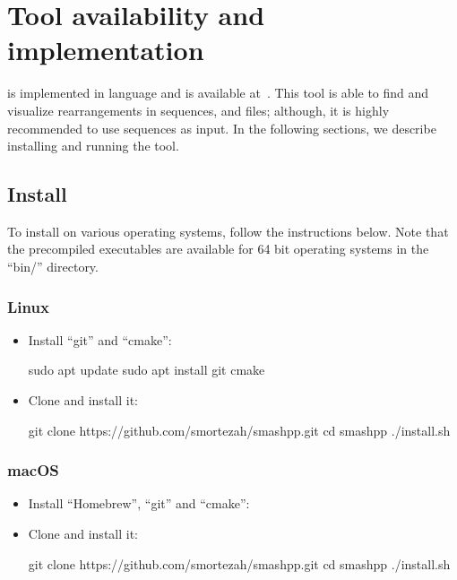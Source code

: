 \documentclass[a4paper,9pt]{extarticle}
\begin{document}
\clearpage
\section{Tool availability and implementation}
\label{sec.tool}
\smashpp is implemented in \cpp language and is available at~\cite{web-smashpp}. This tool is able to find and visualize rearrangements in sequences, \fasta and \fastq files; although, it is highly recommended to use sequences as input. In the following sections, we describe installing and running the \smashpp tool.

\subsection{Install}
To install \smashpp on various operating systems, follow the instructions below. Note that the precompiled executables are available for 64 bit operating systems in the ``bin/'' directory.


\subsubsection*{Linux}
\begin{itemize}
  \item Install ``git'' and ``cmake'':
\begin{code}[style=bash]
sudo apt update
sudo apt install git cmake
\end{code}
\item Clone \smashpp and install it:
\begin{code}[style=bash]
git clone https://github.com/smortezah/smashpp.git
cd smashpp
./install.sh
\end{code}
\end{itemize}

\subsubsection*{macOS}
\begin{itemize}
    \item Install ``Homebrew'', ``git'' and ``cmake'':
\item Clone \smashpp and install it:
\begin{code}[style=bash]
git clone https://github.com/smortezah/smashpp.git
cd smashpp
./install.sh
\end{code}
\end{itemize}
\end{document}
